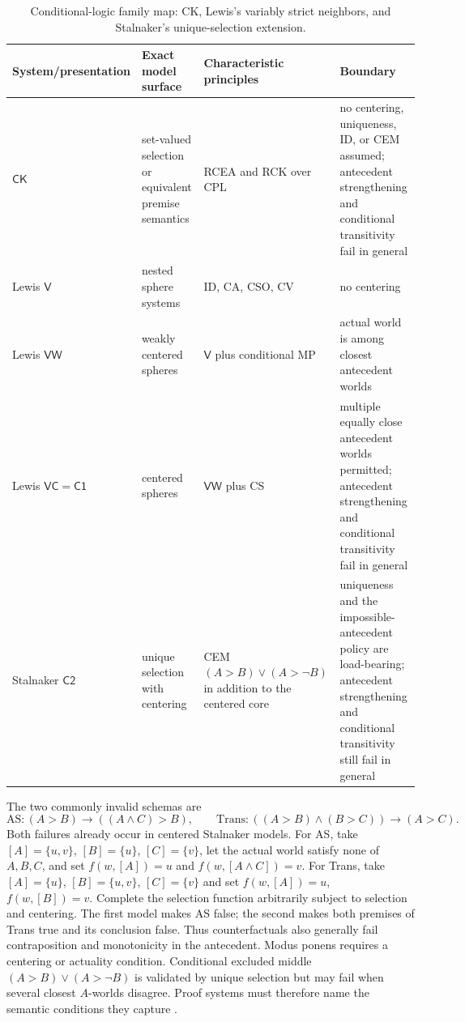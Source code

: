 \begin{table}[htbp]
\centering\scriptsize
\begin{tabularx}{\textwidth}{@{}l X X X@{}}
\toprule
System/presentation & Exact model surface & Characteristic principles & Boundary \\
\midrule
\(\mathsf{CK}\) & set-valued selection or equivalent premise semantics &
RCEA and RCK over CPL & no centering, uniqueness, ID, or CEM assumed;
antecedent strengthening and conditional transitivity fail in general \\
Lewis \(\mathsf V\) & nested sphere systems & ID, CA, CSO, CV & no centering \\
Lewis \(\mathsf{VW}\) & weakly centered spheres & \(\mathsf V\) plus
conditional MP & actual world is among closest antecedent worlds \\
Lewis \(\mathsf{VC}=\mathsf{C1}\) & centered spheres &
\(\mathsf{VW}\) plus CS & multiple equally close antecedent worlds permitted;
antecedent strengthening and conditional transitivity fail in general \\
Stalnaker \(\mathsf{C2}\) & unique selection with centering & CEM
\((A>B)\lor(A>\neg B)\) in addition to the centered core & uniqueness and the
impossible-antecedent policy are load-bearing; antecedent strengthening and
conditional transitivity still fail in general \\
\bottomrule
\end{tabularx}
\caption{Conditional-logic family map: CK, Lewis's variably strict neighbors,
and Stalnaker's unique-selection extension.}
\label{tab:p08-conditional-logics}
\end{table}

The two commonly invalid schemas are
\[
 \mathrm{AS}\colon (A>B)\to((A\land C)>B),
 \qquad
 \mathrm{Trans}\colon ((A>B)\land(B>C))\to(A>C).
\]
Both failures already occur in centered Stalnaker models.  For AS, take
\([A]=\{u,v\}\), \([B]=\{u\}\), \([C]=\{v\}\), let the actual world satisfy
none of \(A,B,C\), and set \(f(w,[A])=u\) and
\(f(w,[A\land C])=v\).  For Trans, take
\([A]=\{u\}\), \([B]=\{u,v\}\), \([C]=\{v\}\) and set
\(f(w,[A])=u\), \(f(w,[B])=v\).  Complete the selection function
arbitrarily subject to selection and centering.  The first model makes AS
false; the second makes both premises of Trans true and its conclusion false.
Thus counterfactuals also generally fail contraposition and monotonicity in the
antecedent. Modus ponens requires a centering or actuality condition.
Conditional excluded middle
\((A>B)\vee(A>\neg B)\) is validated by unique selection but may fail when
several closest \(A\)-worlds disagree. Proof systems must therefore name the
semantic conditions they capture \cite{Nute1980,Bennett2003}.

